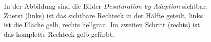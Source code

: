 \documentclass[11pt]{article}
\begin{document}
\begin{figure}[H]
\caption{In der Abbildung sind die Bilder \textit{Desaturation by Adaption} sichtbar. Zuerst (links) ist das sichtbare Rechteck in der Hälfte geteilt, links ist die Fläche gelb, rechts hellgrau. Im zweiten Schritt (rechts) ist das komplette Rechteck gelb gefärbt.}
\label{desat}
\end{figure}
\end{document}

